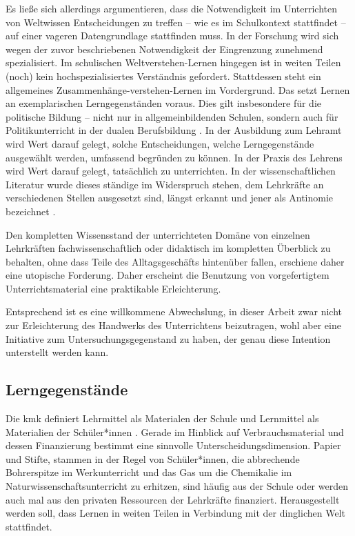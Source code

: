 Es ließe sich allerdings argumentieren, dass die Notwendigkeit im Unterrichten von Weltwissen Entscheidungen zu treffen -- wie es im Schulkontext stattfindet -- auf einer vageren Datengrundlage stattfinden muss. In der Forschung wird sich wegen der zuvor beschriebenen Notwendigkeit der Eingrenzung zunehmend spezialisiert. Im schulischen Weltverstehen-Lernen hingegen ist in weiten Teilen (noch) kein hochspezialisiertes Verständnis gefordert. Stattdessen steht ein allgemeines Zusammenhänge-verstehen-Lernen im Vordergrund. Das setzt Lernen an exemplarischen Lerngegenständen voraus. 
Dies gilt insbesondere für die politische Bildung -- nicht nur in allgemeinbildenden Schulen, sondern auch für Politikunterricht in der dualen Berufsbildung \autocite[vgl. \gls{abs} \ref{bplan}: \gls{S} \pageref{bplan} \&][4; 9-13]{bplan}.
In der Ausbildung zum Lehramt wird Wert darauf gelegt, solche Entscheidungen, welche Lerngegenstände ausgewählt werden, umfassend begründen zu können. 
In der Praxis des Lehrens wird Wert darauf gelegt, tatsächlich zu unterrichten.
In der wissenschaftlichen Literatur wurde dieses ständige im Widerspruch stehen, dem Lehrkräfte an verschiedenen Stellen ausgesetzt sind, längst erkannt und jener als Antinomie bezeichnet \autocite[\gls{vgl} \gls{zb}][]{Helsper.2001}.

Den kompletten Wissensstand der unterrichteten Domäne von einzelnen Lehrkräften fachwissenschaftlich oder didaktisch im kompletten Überblick zu behalten, ohne dass Teile des Alltagsgeschäfts hintenüber fallen, erschiene daher eine utopische Forderung. Daher erscheint die Benutzung von vorgefertigtem Unterrichtsmaterial eine praktikable Erleichterung. 


Entsprechend ist es eine willkommene Abwechslung, in dieser Arbeit zwar nicht zur Erleichterung des Handwerks des Unterrichtens beizutragen, wohl aber eine Initiative zum Untersuchungsgegenstand zu haben, der genau diese Intention unterstellt werden kann. 

\subsection{Lerngegenstände}
Die \gls{kmk} definiert Lehrmittel als Materialen der Schule und Lernmittel als Materialien der Schüler*innen \autocite{KMKMittel}. Gerade im Hinblick auf Verbrauchsmaterial und dessen Finanzierung bestimmt eine sinnvolle Unterscheidungsdimension. Papier und Stifte, stammen in der Regel von Schüler*innen, die abbrechende Bohrerspitze im Werkunterricht und %
das Gas um die Chemikalie im Naturwissenschaftsunterricht zu erhitzen, sind häufig aus der Schule oder werden auch mal aus den privaten Ressourcen der Lehrkräfte finanziert. Herausgestellt werden soll, dass Lernen in weiten Teilen in Verbindung mit der dinglichen Welt stattfindet.

